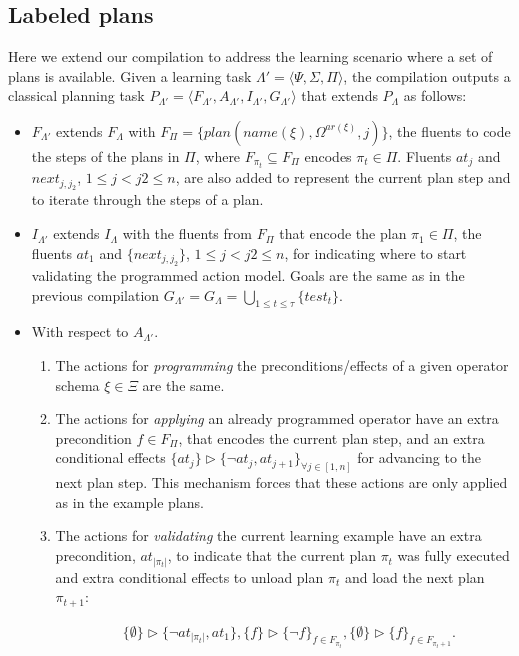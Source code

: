 \documentclass[letterpaper]{article} %
\newcommand{\tup}[1]{{\langle #1 \rangle}}
\begin{document}
\subsection{Labeled plans}
Here we extend our compilation to address the learning scenario where a set of plans is available. Given a learning task $\Lambda'=\tup{\Psi,\Sigma,\Pi}$, the compilation outputs a classical planning task $P_{\Lambda'}=\tup{F_{\Lambda'},A_{\Lambda'},I_{\Lambda'},G_{\Lambda'}}$ that extends $P_{\Lambda}$ as follows:
\begin{itemize}
\item $F_{\Lambda'}$ extends $F_{\Lambda}$ with $F_{\Pi}=\{plan(name(\xi),\Omega^{ar(\xi)},j)\}$, the fluents to code the steps of the plans in $\Pi$, where $F_{\pi_t}\subseteq F_{\Pi}$ encodes $\pi_t\in \Pi$. Fluents $at_j$ and $next_{j,j_2}$, {\small $1\leq j<j2\leq n$}, are also added to represent the current plan step and to iterate through the steps of a plan.
\item $I_{\Lambda'}$ extends $I_{\Lambda}$ with the fluents from $F_{\Pi}$ that encode the plan $\pi_1\in \Pi$, the fluents $at_1$ and $\{next_{j,j_2}\}$, {\small $1\leq j<j2\leq n$}, for indicating where to start validating the programmed action model. Goals are the same as in the previous compilation $G_{\Lambda'}=G_{\Lambda}=\bigcup_{1\leq t\leq \tau}\{test_t\}$.
\item With respect to $A_{\Lambda'}$.
\begin{enumerate}
\item The actions for {\em programming} the preconditions/effects of a given operator schema $\xi\in\Xi$ are the same.
\item The actions for {\em applying} an already programmed operator have an extra precondition $f\in F_{\Pi}$, that encodes the current plan step, and an extra conditional effects $\{at_{j}\}\rhd\{\neg at_{j},at_{j+1}\}_{\forall j\in [1,n]}$ for advancing to the next plan step. This mechanism forces that these actions are only applied as in the example plans.
\item The actions for {\em validating} the current learning example have an extra precondition, $at_{|\pi_t|}$, to indicate that the current plan $\pi_t$ was fully executed and extra conditional effects to unload plan $\pi_{t}$ and load the next plan $\pi_{t+1}$:
\begin{small}
\begin{align*}
&\{\emptyset\}\rhd\{\neg at_{|\pi_t|},at_1\}, \{f\}\rhd\{\neg f\}_{f\in F_{\pi_t}}, \{\emptyset\}\rhd\{f\}_{f\in F_{\pi_t+1}}.
\end{align*}
\end{small}
\end{enumerate}
\end{itemize}
\end{document}
